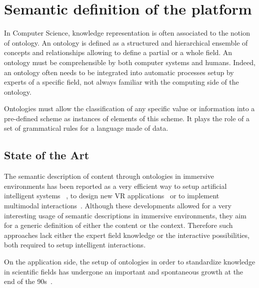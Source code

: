 \documentclass{vgtc}                          %
\begin{document}
\section{Semantic definition of the platform}

In Computer Science, knowledge representation is often associated to the notion of ontology. An ontology is defined as a structured and hierarchical ensemble of concepts and relationships allowing to define a partial or a whole field. An ontology must be comprehensible by both  computer systems and humans. Indeed, an ontology often needs to be integrated into automatic processes setup by experts of a specific field, not always familiar with the computing side of the ontology.

Ontologies must allow the classification of any specific value or information into a pre-defined scheme as instances of elements of this scheme. It plays the role of a set of grammatical rules for a language made of data.

\subsection{State of the Art}

The semantic description of content through ontologies in immersive environments has been reported as a very efficient way to setup artificial intelligent systems ~\cite{Wiebusch:2015aa}, to design new VR applications~\cite{kleinermann2005designing} or to implement multimodal interactions~\cite{irawati2005semantic}. Although these developments allowed for a very interesting usage of semantic descriptions in immersive environments, they aim for a generic definition of either the content or the context. Therefore such approaches lack either the expert field knowledge or the interactive possibilities, both required to setup intelligent interactions.

On the application side, the setup of ontologies in order to standardize knowledge in scientific fields has undergone an important and spontaneous growth at the end of the 90s~\cite{schulze-kremer_ontologies_2002}.
\end{document}
